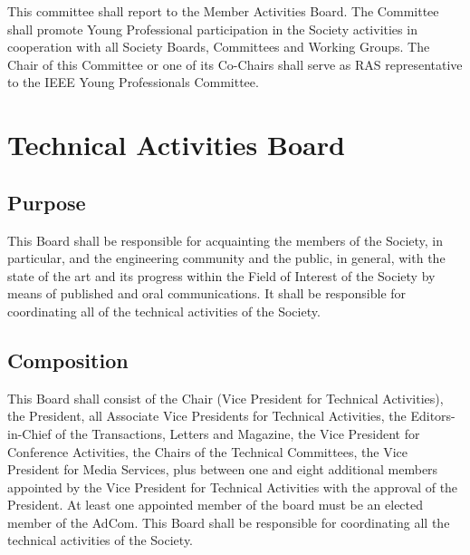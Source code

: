 \documentclass[10pt]{article}
\begin{document}
This committee shall report to the Member Activities Board. The Committee shall promote Young Professional participation in the Society activities in cooperation with all Society Boards, Committees and Working Groups. The Chair of this Committee or one of its Co-Chairs shall serve as RAS representative to the IEEE Young Professionals Committee.




\section{Technical Activities Board}
\label{TAB}

\subsection{Purpose}

This Board shall be responsible for acquainting the members of the Society, in particular, and the engineering community and the public, in general, with the state of the art and its progress within the Field of Interest of the Society by means of published and oral communications. It shall be responsible for coordinating all of the technical activities of the Society.


\subsection{Composition}

This Board shall consist of the Chair (Vice President for Technical Activities), the President, all Associate Vice Presidents for Technical Activities, the Editors-in-Chief of the Transactions, Letters and Magazine, the Vice President for Conference Activities, the Chairs of the Technical Committees, the Vice President for Media Services, plus between one and eight additional members appointed by the Vice President for Technical Activities with the approval of the President. At least one appointed member of the board must be an elected member of the AdCom. This Board shall be responsible for coordinating all the technical activities of the Society.
\end{document}
